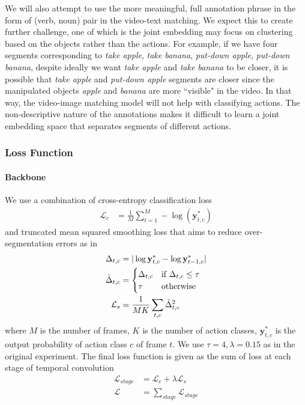 We will also attempt to use the more meaningful, full annotation phrase in the form of (verb, noun) pair in the video-text matching. We expect this to create further challenge, one of which is the joint embedding may focus on clustering based on the objects rather than the actions. For example, if we have four segments corresponding to \textit{take apple}, \textit{take banana}, \textit{put-down apple}, \textit{put-down banana}, despite ideally we want \textit{take apple} and \textit{take banana} to be closer, it is possible that \textit{take apple} and \textit{put-down apple} segments are closer since the manipulated objects \textit{apple} and \textit{banana} are more ``visible" in the video. In that way, the video-image matching model will not help with classifying actions. The non-descriptive nature of the annotations makes it difficult to learn a joint embedding space that separates segments of different actions.

\subsubsection{Loss Function}
\paragraph{Backbone} We use a combination of cross-entropy classification loss
\begin{align*}
    \mathcal{L}_c&=\frac{1}{M}\sum_{t=1}^M-\log(\mathbf{y}^*_{t,c})
\end{align*}
and truncated mean squared smoothing loss that aims to reduce over-segmentation errors as in \cite{8953830}
\begin{align*}
    \Delta_{t,c}&=|\log\mathbf{y}^*_{t,c}-\log\mathbf{y}^*_{t-1,c}|\\
    \Tilde{\Delta}_{t,c}&=\begin{cases}\Delta_{t,c} &\text{if $\Delta_{t,c}\le\tau$}\\\tau &\text{otherwise}\end{cases}\\
    \mathcal{L}_s&=\frac{1}{MK}\sum_{t,c}\Tilde{\Delta}^2_{t,c}
\end{align*}
where $M$ is the number of frames, $K$ is the number of action classes, $\mathbf{y}^*_{t,c}$ is the output probability of action class $c$ of frame $t$. We use $\tau=4,\lambda=0.15$ as in the original experiment. The final loss function is given as the sum of loss at each stage of temporal convolution
\begin{align*}
    \mathcal{L}_{stage}&=\mathcal{L}_c+\lambda\mathcal{L}_s\\
    \mathcal{L}&=\sum_{stage}\mathcal{L}_{stage}
\end{align*}

